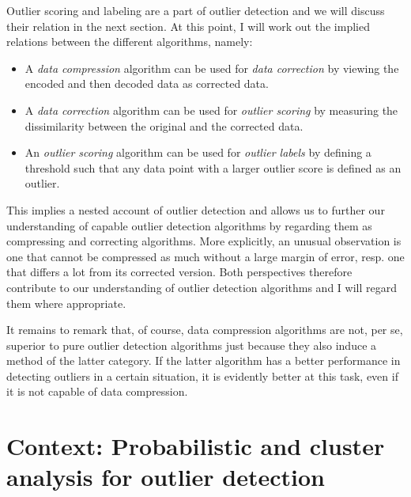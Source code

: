\documentclass[]{report}
\providecommand{\tightlist}{%
  \setlength{\itemsep}{0pt}\setlength{\parskip}{0pt}}
\theoremstyle{definition}
\theoremstyle{definition}
\theoremstyle{definition}
\theoremstyle{remark}
\begin{document}
Outlier scoring and labeling are a part of outlier detection and we will
discuss their relation in the next section. At this point, I will work
out the implied relations between the different algorithms, namely:

\begin{itemize}
\tightlist
\item
  A \emph{data compression} algorithm can be used for \emph{data
  correction} by viewing the encoded and then decoded data as corrected
  data.
\item
  A \emph{data correction} algorithm can be used for \emph{outlier
  scoring} by measuring the dissimilarity between the original and the
  corrected data.
\item
  An \emph{outlier scoring} algorithm can be used for \emph{outlier
  labels} by defining a threshold such that any data point with a larger
  outlier score is defined as an outlier.
\end{itemize}

This implies a nested account of outlier detection and allows us to
further our understanding of capable outlier detection algorithms by
regarding them as compressing and correcting algorithms. More
explicitly, an unusual observation is one that cannot be compressed as
much without a large margin of error, resp. one that differs a lot from
its corrected version. Both perspectives therefore contribute to our
understanding of outlier detection algorithms and I will regard them
where appropriate.

It remains to remark that, of course, data compression algorithms are
not, per se, superior to pure outlier detection algorithms just because
they also induce a method of the latter category. If the latter
algorithm has a better performance in detecting outliers in a certain
situation, it is evidently better at this task, even if it is not
capable of data compression.

\hypertarget{context-probabilistic-and-cluster-analysis-for-outlier-detection}{%
\section{Context: Probabilistic and cluster analysis for outlier
detection}\label{context-probabilistic-and-cluster-analysis-for-outlier-detection}}
\end{document}

